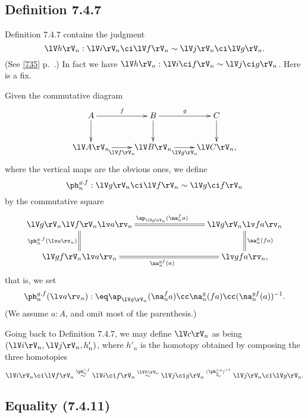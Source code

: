 \documentclass[12pt]{article}
\begin{document}

\subsection{Definition 7.4.7}\label{747}

Definition 7.4.7 contains the judgment 
$$
\lV h\rV_n:\lV i\rV_n\ci\lV f\rV_n\sim\lV j\rV_n\ci\lV g\rV_n.
$$ 
(See \eqref{735} p.~\pageref{735}.) In fact we have $\lV h\rV_n:\lV i\ci f\rV_n\sim\lV j\ci g\rV_n$. Here is a fix. 

Given the commutative diagram
$$
\xymatrix{
A\ar[r]^f\ar[d]&B\ar[r]^g\ar[d]&C\ar[d]\\
\lV A\rV_n\ar[r]_{\lV f\rV_n}&\lV B\rV_n\ar[r]_{\lV g\rV_n}&\lV C\rV_n,}
$$ 
where the vertical maps are the obvious ones, we define 
$$
\ph_n^{g,f}:\lV g\rV_n\ci\lV f\rV_n\sim\lV g\ci f\rV_n
$$ 
by the commutative square 
$$
\xymatrix{
\lV g\rV_n\lV f\rV_n\lv a\rv_n\ar@{=}[d]_{\ph_n^{g,f}(\lv a\rv_n)}\ar@{=}[rrr]^{\ap_{\lV g\rV_n}(\na_n^fa)}&&&
\lV g\rV_n\lv fa\rv_n\ar@{=}[d]^{\na_n^g(fa)}\\
\lV gf\rV_n\lv a\rv_n\ar@{=}[rrr]_{\na_n^{gf}(a)}&&&\lv gfa\rv_n,}
$$ 
that is, we set 
$$
\ph_n^{g,f}(\lv a\rv_n):\eq\ap_{\lV g\rV_n}(\na_n^fa)\cc\na_n^g(fa)\cc(\na_n^{gf}(a))^{-1}.
$$ 
(We assume $a:A$, and omit most of the parenthesis.)

Going back to Definition 7.4.7, we may define $\lV c\rV_n$ as being $(\lV i\rV_n,\lV j\rV_n,h'_n)$, where $h'_n$ is the homotopy obtained by composing the three homotopies
$$
\lV i\rV_n\ci\lV f\rV_n\overset{\ph_n^{i,f}}{\sim}\lV i\ci f\rV_n\overset{\lV h\rV_n}{\sim}\lV j\ci g\rV_n\overset{(\ph_n^{j,g})^{-1}}{\sim}\lV j\rV_n\ci\lV g\rV_n.
$$


\subsection{Equality (7.4.11)}
\end{document}
